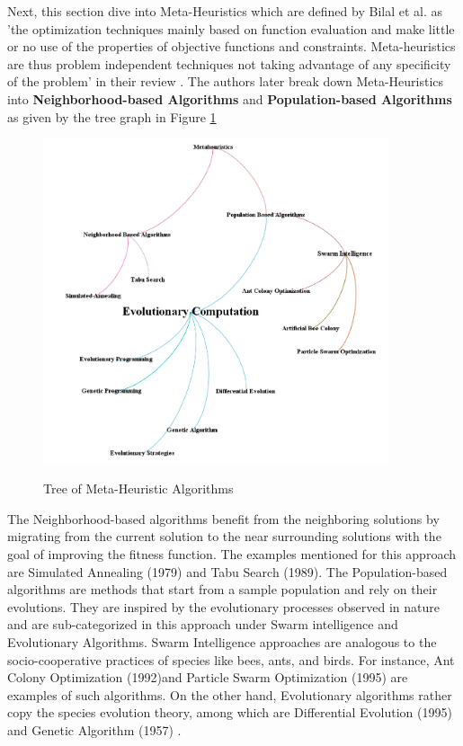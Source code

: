 Next, this section dive into Meta-Heuristics which are defined by Bilal et al. as 'the optimization
techniques mainly based on function evaluation and make little
or no use of the properties of objective functions and constraints.
Meta-heuristics are thus problem independent techniques not taking
advantage of any specificity of the problem’ in their review \cite{R37}.
The authors later break down Meta-Heuristics into \textbf{Neighborhood-based Algorithms} and \textbf{Population-based Algorithms}
as given by the tree graph in Figure \ref{Tree}

\begin{figure}[H]
    \begin{center}
        \includegraphics[width=4in]{images/Chap1/Tree_Metaheuristic.png}\\
        \caption{Tree of Meta-Heuristic Algorithms \cite{R37}}
        \label{Tree}
    \end{center}
\end{figure}

The Neighborhood-based algorithms benefit from the neighboring solutions by migrating from the current solution to 
the near surrounding solutions with the goal of improving the fitness function. The examples mentioned for this 
approach are Simulated Annealing (1979) and Tabu Search (1989). The Population-based algorithms are methods that start from a sample population and rely on their evolutions. 
They are inspired by the evolutionary processes observed in nature and are sub-categorized in this approach under 
Swarm intelligence and Evolutionary Algorithms. 
Swarm Intelligence approaches are analogous to the socio-cooperative practices of species like bees, ants, and birds. 
For instance, Ant Colony Optimization (1992)and Particle Swarm Optimization (1995) are examples of such algorithms. 
On the other hand, Evolutionary algorithms rather copy the species evolution theory, among which are Differential 
Evolution (1995) and Genetic Algorithm (1957) \cite{R37}.

